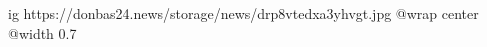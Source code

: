  
 
 
 
 

\ifcmt
  ig https://donbas24.news/storage/news/drp8vtedxa3yhvgt.jpg
  @wrap center
  @width 0.7
\fi
